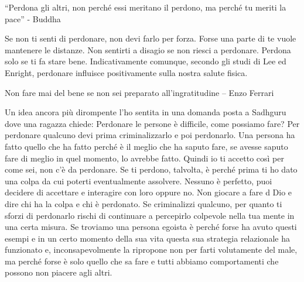 \documentclass[12pt]{book} %
\begin{document}
“Perdona gli altri, non perché essi meritano il perdono, ma perché tu meriti la pace” - Buddha

Se non ti senti di perdonare, non devi farlo per forza. Forse una parte di te vuole mantenere le distanze. Non
sentirti a disagio se non riesci a perdonare. Perdona solo se ti fa stare bene. Indicativamente comunque, secondo gli studi di Lee ed Enright, perdonare influisce
positivamente sulla nostra salute fisica.

Non fare mai del bene se non sei preparato all'ingratitudine – Enzo Ferrari

Un idea ancora più dirompente l'ho sentita in una domanda posta a Sadhguru dove una ragazza chiede: Perdonare le persone è difficile, come possiamo fare?
Per perdonare qualcuno devi prima criminalizzarlo e poi perdonarlo. 
Una persona ha fatto quello che ha fatto perché è il meglio che ha saputo fare, se avesse saputo fare di meglio in quel momento, lo avrebbe fatto. Quindi io ti accetto così per come sei, non c'è da perdonare. Se ti perdono, talvolta, è perché prima ti ho dato una colpa da cui poterti eventualmente assolvere. Nessuno è perfetto, puoi decidere di accettare e interagire con loro oppure no. Non giocare a fare d
Dio e dire chi ha la colpa e chi è perdonato. Se criminalizzi qualcuno, per quanto ti sforzi di perdonarlo rischi di continuare a percepirlo colpevole nella tua mente in una certa misura.
Se troviamo una persona egoista è perché forse ha avuto questi esempi e in un certo momento della sua vita questa sua strategia relazionale ha funzionato e, inconsapevolmente la ripropone non per farti volutamente del male, ma perché forse è solo quello che sa fare e tutti abbiamo comportamenti che possono non piacere agli altri.
\end{document}

